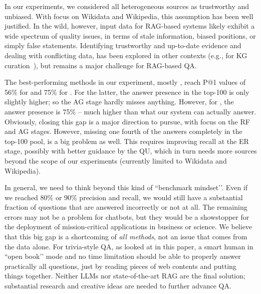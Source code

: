 \vspace{0.2cm}
In our experiments, we considered all heterogeneous sources as trustworthy and unbiased. With focus on Wikidata and Wikipedia, this assumption has been well justified. In the wild, however, input data for RAG-based systems likely exhibit a wide spectrum of quality issues, in terms of stale information, biased positions, or simply false statements. Identifying trustworthy and up-to-date evidence and dealing with conflicting data, has been explored in other contexts (e.g., for KG curation~\cite{Dong-Trust:PVLDB2015}), but remains a major challenge for RAG-based QA.


\vspace{0.2cm}
 The best-performing methods in our experiment, mostly \method, reach P@1 values of 56\% for \compmix and 75\% for \timequestions. 
For the latter, the answer presence in the top-100 is only slightly higher; so the AG stage hardly misses anything.
However, for \compmix, the answer presence is 75\% -- much higher than what our system can actually answer. Obviously, closing this gap is a major direction to pursue, with focus on the RF and AG stages. However, missing one fourth of the answers completely in the top-100 pool, is a big problem as well. This requires improving recall at the ER stage, possibly with better guidance by the QU, which in turn needs more sources beyond the scope of our experiments (currently limited to Wikidata and Wikipedia). 

In general, we need to think beyond this kind of ``benchmark mindset’’. Even if we reached 80\% or 90\% precision and recall, we would still have a substantial fraction of questions that are answered incorrectly
or not at all. 
The remaining errors may not be a problem for chatbots, but they would be a showstopper for the deployment of mission-critical applications in business or science. We believe that this big gap is a shortcoming of {\em all methods}, not an issue that comes from the data alone. For trivia-style QA, as looked at in this paper, a smart human in ``open book’’ mode and no time limitation should be able to properly answer practically all questions, just by reading pieces of web contents and putting things together. Neither LLMs nor state-of-the-art RAG are the final solution; substantial research and creative ideas are needed to further advance QA.
